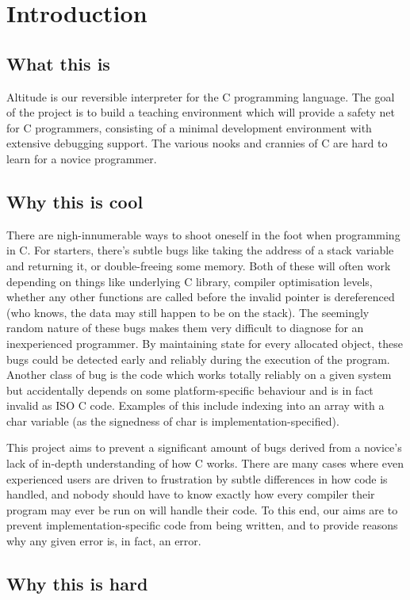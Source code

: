 \documentclass[a4paper]{report}
\begin{document}
\tableofcontents

\chapter{Introduction}

\section{What this is}
Altitude is our reversible interpreter for the C programming language. The goal of the project is to build a teaching environment which will provide a safety net for C programmers, consisting of a minimal development environment with extensive debugging support. The various nooks and crannies of C are hard to learn for a novice programmer.
\section{Why this is cool}
There are nigh-innumerable ways to shoot oneself in the foot when programming in C. For starters, there’s subtle bugs like taking the address of a stack variable and returning it, or double-freeing some memory. Both of these will often work depending on things like underlying C library, compiler optimisation levels, whether any other functions are called before the invalid pointer is dereferenced (who knows, the data may still happen to be on the stack). The seemingly random nature of these bugs makes them very difficult to diagnose for an inexperienced programmer. By maintaining state for every allocated object, these bugs could be detected early and reliably during the execution of the program. Another class of bug is the code which works totally reliably on a given system but accidentally depends on some platform-specific behaviour and is in fact invalid as ISO C code. Examples of this include indexing into an array with a char variable (as the signedness of char is implementation-specified).
\par
This project aims to prevent a significant amount of bugs derived from a novice's lack of in-depth understanding of how C works. There are many cases where even experienced users are driven to frustration by subtle differences in how code is handled, and nobody should have to know exactly how every compiler their program may ever be run on will handle their code. To this end, our aims are to prevent implementation-specific code from being written, and to provide reasons why any given error is, in fact, an error.
\section{Why this is hard}
\end{document}
